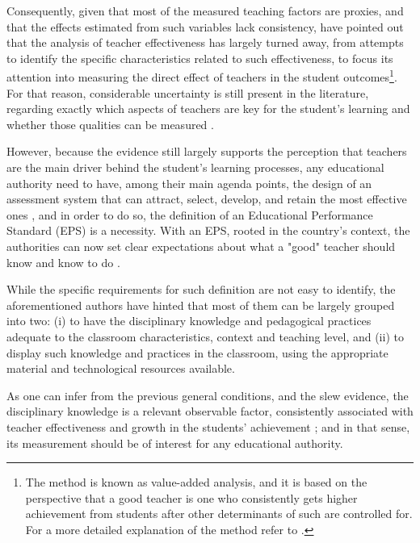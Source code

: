 {Consequently, given that most of the measured teaching factors are proxies, and that the effects estimated from such variables lack consistency, \citet{Hanushek_et_al_2012} have pointed out that the analysis of teacher effectiveness has largely turned away, from attempts to identify the specific characteristics related to such effectiveness, to focus its attention into measuring the direct effect of teachers in the student outcomes\footnote{The method is known as value-added analysis, and it is based on the perspective that a good teacher is one who consistently gets higher achievement from students after other determinants of such are controlled for. For a more detailed explanation of the method refer to \citet{Scherrer_2011}.}. For that reason, considerable uncertainty is still present in the literature, regarding exactly which aspects of teachers are key for the student's learning and whether those qualities can be measured \cite{Rockoff_2004, Clotfelter_et_al_2006}.

However, because the evidence still largely supports the perception that teachers are the main driver behind the student's learning processes, any educational authority need to have, among their main agenda points, the design of an assessment system that can attract, select, develop, and retain the most effective ones \cite{Elacqua_et_al_2018}, and in order to do so, the definition of an Educational Performance Standard (EPS) is a necessity. With an EPS, rooted in the country's context, the authorities can now set clear expectations about what a "good" teacher should know and know to do \cite{Hincapie_et_al_2020}. 

While the specific requirements for such definition are not easy to identify, the aforementioned authors have hinted that most of them can be largely grouped into two: (i) to have the disciplinary knowledge and pedagogical practices adequate to the classroom characteristics, context and teaching level, and (ii) to display such knowledge and practices in the classroom, using the appropriate material and technological resources available. 

As one can infer from the previous general conditions, and the slew evidence, the disciplinary knowledge is a relevant observable factor, consistently associated with teacher effectiveness and growth in the students' achievement \cite{Santibanez_2006, Clotfelter_et_al_2006, Clotfelter_et_al_2007, Hanushek_et_al_2006, Marshall_2009, Rockoff_et_al_2011, Kane_et_al_2011, Kane_et_al_2012, Ome_2012, Metzler_et_al_2012, Kane_et_al_2013, Araujo_et_al_2016, Bietenbeck_et_al_2018, Estrada_2019}; and in that sense, its measurement should be of interest for any educational authority.

}
